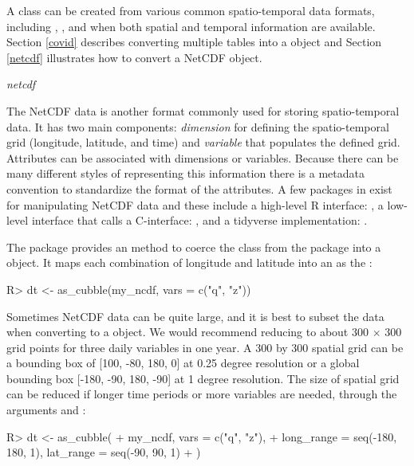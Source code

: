 \documentclass[
  shortnames]{jss}
\begin{document}
A  class can be created from various common spatio-temporal data formats, including , , and  when both spatial and temporal information are available. Section \ref{covid} describes converting multiple tables into a  object and Section \ref{netcdf} illustrates how to convert a NetCDF object.

\emph{netcdf}

The NetCDF data is another format commonly used for storing spatio-temporal data. It has two main components: \emph{dimension} for defining the spatio-temporal grid (longitude, latitude, and time) and \emph{variable} that populates the defined grid. Attributes can be associated with dimensions or variables. Because there can be many different styles of representing this information there is a metadata convention \citep{hassell_data_2017} to standardize the format of the attributes. A few packages in  exist for manipulating NetCDF data and these include a high-level R interface:  \citep{ncdf4}, a low-level interface that calls a C-interface:  \citep{rnetcdf}, and a tidyverse implementation:  \citep{tidync}.

The  package provides an  method to coerce the  class from the  package into a  object. It maps each combination of longitude and latitude into an  as the :

\begin{CodeChunk}
\begin{CodeInput}
R> dt <- as_cubble(my_ncdf, vars = c("q", "z"))
\end{CodeInput}
\end{CodeChunk}

Sometimes NetCDF data can be quite large, and it is best to subset the data when converting to a  object. We would recommend reducing to about 300 \(\times\) 300 grid points for three daily variables in one year. A 300 by 300 spatial grid can be a bounding box of {[}100, -80, 180, 0{]} at 0.25 degree resolution or a global bounding box {[}-180, -90, 180, -90{]} at 1 degree resolution.
The size of spatial grid can be reduced if longer time periods or more variables are needed, through the arguments  and :

\begin{CodeChunk}
\begin{CodeInput}
R> dt <- as_cubble(
+   my_ncdf, vars = c("q", "z"),
+   long_range = seq(-180, 180, 1), lat_range = seq(-90, 90, 1)
+   )
\end{CodeInput}
\end{CodeChunk}
\end{document}
